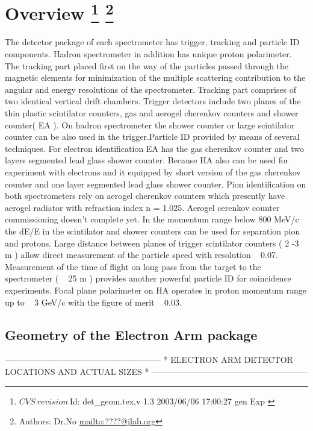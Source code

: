 \section[Overview]{Overview
\footnote{
  $CVS~revision~ $Id: det_geom.tex,v 1.3 2003/06/06 17:00:27 gen Exp $ $
}
\footnote{Authors: Dr.No \url{mailto:????@jlab.org}}
}

        The detector package of each spectrometer has trigger, tracking and particle 
ID components. Hadron spectrometer in addition has unique proton polarimeter. The 
tracking part placed first on the way of the particles passed through the magnetic 
elements for minimization of the multiple scattering contribution to the angular and 
energy resolutions of the spectrometer. Tracking part comprises of 
two identical vertical drift chambers. Trigger detectors include two planes of the
thin plastic scintilator counters, gas and aerogel cherenkov counters and shower 
counter( EA ). On hadron spectrometer the shower counter or large scintilator counter 
can be also used in the trigger.Particle ID provided by means of several techniques. 
For electron identification EA has the gas cherenkov counter and two layers segmented 
lead glass shower counter. Because HA also can be used for experiment with electrons 
and it equipped by short version of the gas cherenkov counter and one layer segmented 
lead glass shower counter. Pion identification on both spectrometers rely on aerogel 
cherenkov counters which presently have aerogel radiator with refraction index n = 1.025. 
Aerogel cerenkov counter commissioning doesn't complete yet. In the momentum range 
below 800 MeV/c the dE/E in the scintilator and shower counters can be used for 
separation pion and protons. Large distance between planes of trigger scintilator 
counters ( 2 -3 m ) allow direct measurement of the particle speed with resolution 
~ 0.07. Measurement of the time of flight on long pass from the target to the 
spectrometer ( ~ 25 m ) provides another powerful particle ID for coincidence experiments.
Focal plane polarimeter on HA operates in proton momentum range up to ~ 3 GeV/c with 
the figure of merit ~ 0.03.

\subsection{Geometry of the Electron Arm package}

          --------------------------------------------------------
          *   ELECTRON ARM DETECTOR LOCATIONS AND ACTUAL SIZES   *
          --------------------------------------------------------

